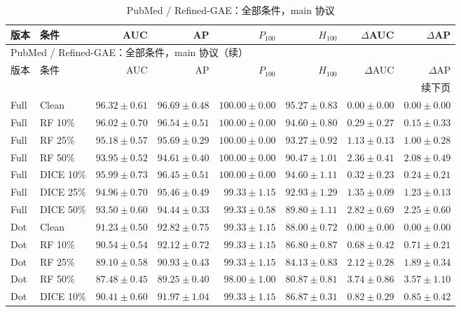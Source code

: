 {\footnotesize
\setlength{\tabcolsep}{3.2pt}
\renewcommand{\arraystretch}{1.10}
\begin{longtable}{llrrrrrr}
\caption{PubMed / Refined-GAE：全部条件，main 协议}\\
\toprule
版本 & 条件 & AUC & AP & $P_{100}$ & $H_{100}$ & $\Delta$AUC & $\Delta$AP \\
\midrule
\endfirsthead
\multicolumn{8}{l}{PubMed / Refined-GAE：全部条件，main 协议（续）}\\
\toprule
版本 & 条件 & AUC & AP & $P_{100}$ & $H_{100}$ & $\Delta$AUC & $\Delta$AP \\
\midrule
\endhead
\midrule\multicolumn{8}{r}{续下页}\\
\endfoot
\bottomrule
\endlastfoot
Full & Clean & $96.32\pm0.61$ & $96.69\pm0.48$ & $100.00\pm0.00$ & $95.27\pm0.83$ & $0.00\pm0.00$ & $0.00\pm0.00$ \\
Full & RF 10\% & $96.02\pm0.70$ & $96.54\pm0.51$ & $100.00\pm0.00$ & $94.60\pm0.80$ & $0.29\pm0.27$ & $0.15\pm0.33$ \\
Full & RF 25\% & $95.18\pm0.57$ & $95.69\pm0.29$ & $100.00\pm0.00$ & $93.27\pm0.92$ & $1.13\pm0.13$ & $1.00\pm0.28$ \\
Full & RF 50\% & $93.95\pm0.52$ & $94.61\pm0.40$ & $100.00\pm0.00$ & $90.47\pm1.01$ & $2.36\pm0.41$ & $2.08\pm0.49$ \\
Full & DICE 10\% & $95.99\pm0.73$ & $96.45\pm0.51$ & $100.00\pm0.00$ & $94.60\pm1.11$ & $0.32\pm0.23$ & $0.24\pm0.21$ \\
Full & DICE 25\% & $94.96\pm0.70$ & $95.46\pm0.49$ & $99.33\pm1.15$ & $92.93\pm1.29$ & $1.35\pm0.09$ & $1.23\pm0.13$ \\
Full & DICE 50\% & $93.50\pm0.60$ & $94.44\pm0.33$ & $99.33\pm0.58$ & $89.80\pm1.11$ & $2.82\pm0.69$ & $2.25\pm0.60$ \\
Dot & Clean & $91.23\pm0.50$ & $92.82\pm0.75$ & $99.33\pm1.15$ & $88.00\pm0.72$ & $0.00\pm0.00$ & $0.00\pm0.00$ \\
Dot & RF 10\% & $90.54\pm0.54$ & $92.12\pm0.72$ & $99.33\pm1.15$ & $86.80\pm0.87$ & $0.68\pm0.42$ & $0.71\pm0.21$ \\
Dot & RF 25\% & $89.10\pm0.58$ & $90.93\pm0.43$ & $99.33\pm1.15$ & $84.13\pm0.83$ & $2.12\pm0.28$ & $1.89\pm0.34$ \\
Dot & RF 50\% & $87.48\pm0.45$ & $89.25\pm0.40$ & $98.00\pm1.00$ & $80.87\pm0.81$ & $3.74\pm0.86$ & $3.57\pm1.10$ \\
Dot & DICE 10\% & $90.41\pm0.60$ & $91.97\pm1.04$ & $99.33\pm1.15$ & $86.87\pm0.31$ & $0.82\pm0.29$ & $0.85\pm0.42$ \\

\end{longtable}}
